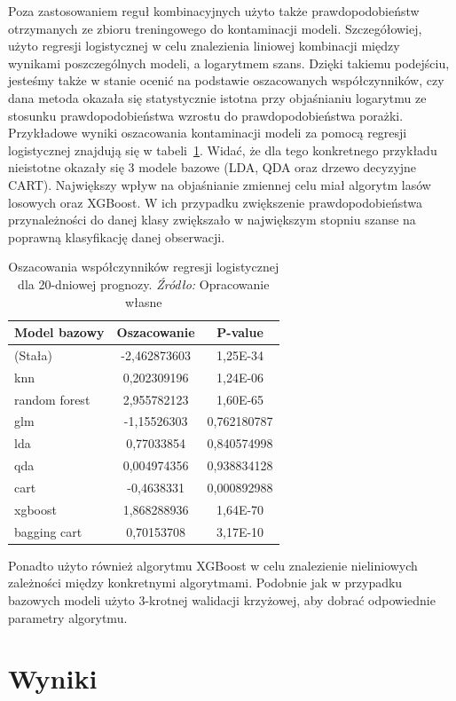 \documentclass[12pt,a4paper,twoside,openany]{book}
\begin{document}
Poza zastosowaniem reguł kombinacyjnych użyto także prawdopodobieństw otrzymanych ze zbioru treningowego do kontaminacji modeli. Szczegółowiej, użyto regresji logistycznej w celu znalezienia liniowej kombinacji między wynikami poszczególnych modeli, a logarytmem szans. Dzięki takiemu podejściu, jesteśmy także w stanie ocenić na podstawie oszacowanych współczynników, czy dana metoda okazała się statystycznie istotna przy objaśnianiu logarytmu ze stosunku prawdopodobieństwa wzrostu do prawdopodobieństwa porażki. Przykładowe wyniki oszacowania kontaminacji modeli za pomocą regresji logistycznej znajdują się w tabeli~\ref{tab010}. Widać, że dla tego konkretnego przykładu nieistotne okazały się 3 modele bazowe (LDA, QDA oraz drzewo decyzyjne CART). Największy wpływ na objaśnianie zmiennej celu miał algorytm lasów losowych oraz XGBoost. W ich przypadku zwiększenie prawdopodobieństwa przynależności do danej klasy zwiększało w największym stopniu szanse na poprawną klasyfikację danej obserwacji.

\begin{table}[ht] 
\caption{Oszacowania współczynników regresji logistycznej dla 20-dniowej prognozy. \textit{Źródło:} Opracowanie własne}
\label{tab010}
\centering
\begin{tabular}{lcc}
  \hline
Model bazowy & Oszacowanie & P-value\\
   \hline
(Stała) & -2,462873603 & 1,25E-34\\
knn & 0,202309196 & 1,24E-06\\
random forest & 2,955782123 & 1,60E-65\\
glm & -1,15526303 & 0,762180787\\
lda & 0,77033854 & 0,840574998\\
qda & 0,004974356 & 0,938834128\\
cart & -0,4638331 & 0,000892988\\
xgboost & 1,868288936 & 1,64E-70\\
bagging cart & 0,70153708 & 3,17E-10\\
  \hline
\end{tabular}
\end{table}


Ponadto użyto również algorytmu XGBoost w celu znalezienie nieliniowych zależności między konkretnymi algorytmami. Podobnie jak w przypadku bazowych modeli użyto 3-krotnej walidacji krzyżowej, aby dobrać odpowiednie parametry algorytmu. 

\section{Wyniki}
\end{document}
